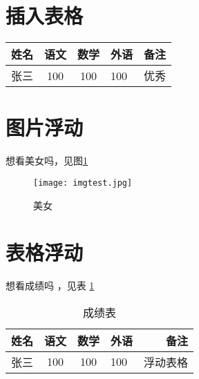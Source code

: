 \documentclass[]{ctexart}
\begin{document}
	\section{插入表格}
	\begin{tabular}{l || c  c | p{1.5cm} | r}
		\hline   %
		姓名 & 语文 & 数学 & 外语 & 备注 \\ %
		\hline \hline  %
		张三 & 100 & 100 & 100 & 优秀 \\	
		\hline   %
	\end{tabular}

	
	

	\section{图片浮动}
	想看美女吗，见图\ref{mm}
	\begin{figure}[htbp]
		\centering			%
		
		\texttt{[image: imgtest.jpg]}
		\caption{美女}		%
		\label{mm}			%
	\end{figure}
	
	\section{表格浮动}
	想看成绩吗 ，见表 \ref{firsttable}
	\begin{table}[htbp]		%
		\centering			%
		\caption{成绩表}		%
		\begin{tabular}{l || c  c | p{1.5cm} | r}
			\hline   %
			姓名 & 语文 & 数学 & 外语 & 备注 \\ %
			\hline \hline  %
			张三 & 100 & 100 & 100 & 浮动表格 \\	
			\hline   %
		\end{tabular}
		\label{firsttable}
	\end{table}
 	
 
\end{document}
